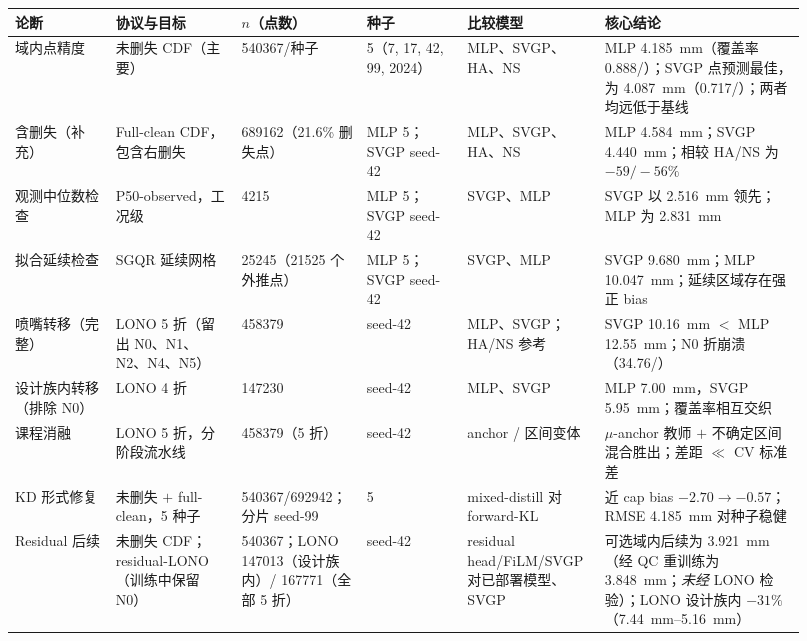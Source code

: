 \begin{table}[p]
\centering
\scriptsize
\setlength{\tabcolsep}{3pt}
\renewcommand{\arraystretch}{1.2}
\begin{tabular}{@{}L{0.12\linewidth}L{0.15\linewidth}L{0.13\linewidth}L{0.12\linewidth}L{0.16\linewidth}L{0.24\linewidth}@{}}
\toprule
论断 & 协议与目标 & $n$（点数） & 种子 & 比较模型 & 核心结论 \\
\midrule
域内点精度 & 未删失 CDF（主要） & \num{540367}/种子 & 5（7, 17, 42, 99, 2024） & MLP、SVGP、HA、NS & MLP \SI{4.185}{mm}（覆盖率 0.888/）；SVGP 点预测最佳，为 \SI{4.087}{mm}（0.717/）；两者均远低于基线 \\
\addlinespace
含删失（补充） & Full-clean CDF，包含右删失 & \num{689162}（21.6\% 删失点） & MLP 5；SVGP seed-42 & MLP、SVGP、HA、NS & MLP \SI{4.584}{mm}；SVGP \SI{4.440}{mm}；相较 HA/\allowbreak NS 为 $-59/-56\%$ \\
\addlinespace
观测中位数检查 & P50-observed，工况级 & \num{4215} & MLP 5；SVGP seed-42 & SVGP、MLP & SVGP 以 \SI{2.516}{mm} 领先；MLP 为 \SI{2.831}{mm} \\
\addlinespace
拟合延续检查 & SGQR 延续网格 & \num{25245}（\num{21525} 个外推点） & MLP 5；SVGP seed-42 & SVGP、MLP & SVGP \SI{9.680}{mm}；MLP \SI{10.047}{mm}；延续区域存在强正 bias \\
\addlinespace
喷嘴转移（完整） & LONO 5 折（留出 N0、N1、N2、N4、N5） & \num{458379} & seed-42 & MLP、SVGP；HA/\allowbreak NS 参考 & SVGP \SI{10.16}{mm} $<$ MLP \SI{12.55}{mm}；N0 折崩溃（34.76/） \\
\addlinespace
设计族内转移（排除 N0） & LONO 4 折 & \num{147230} & seed-42 & MLP、SVGP & MLP \SI{7.00}{mm}，SVGP \SI{5.95}{mm}；覆盖率相互交织 \\
\addlinespace
课程消融 & LONO 5 折，分阶段流水线 & \num{458379}（5 折） & seed-42 & anchor / 区间变体 & $\mu$-anchor 教师 $+$ 不确定区间混合胜出；差距 $\ll$ CV 标准差 \\
\addlinespace
KD 形式修复 & 未删失 $+$ full-clean，5 种子 & \num{540367}/\allowbreak\num{692942}；分片 seed-99 & 5 & mixed-distill 对 forward-KL & 近 cap bias $-2.70\to-0.57$；RMSE \SI{4.185}{mm} 对种子稳健 \\
\addlinespace
Residual 后续 & 未删失 CDF；residual-LONO（训练中保留 N0） & \num{540367}；LONO \num{147013}（设计族内）/ \num{167771}（全部 5 折） & seed-42 & residual head/\allowbreak FiLM/\allowbreak SVGP 对已部署模型、SVGP & 可选域内后续为 \SI{3.921}{mm}（经 QC 重训练为 \SI{3.848}{mm}；\emph{未经} LONO 检验）；LONO 设计族内 $-31\%$（\SIrange{7.44}{5.16}{mm}） \\

\end{tabular}
\end{table}
